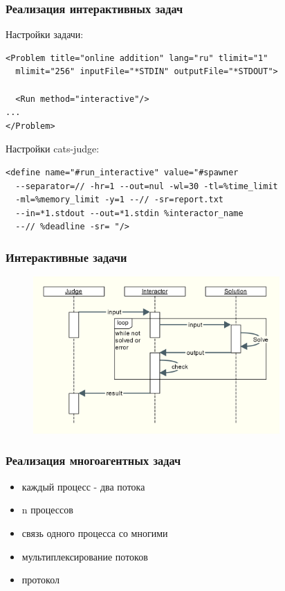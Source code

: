 \documentclass{beamer}
\begin{document}
\begin{frame}[fragile]
  \frametitle{Реализация интерактивных задач}
Настройки задачи:
\begin{lstlisting}
<Problem title="online addition" lang="ru" tlimit="1"
  mlimit="256" inputFile="*STDIN" outputFile="*STDOUT">

  <Run method="interactive"/>
...
</Problem>
\end{lstlisting}
Настройки cats-judge:
\begin{lstlisting}
<define name="#run_interactive" value="#spawner
  --separator=// -hr=1 --out=nul -wl=30 -tl=%time_limit
  -ml=%memory_limit -y=1 --// -sr=report.txt
  --in=*1.stdout --out=*1.stdin %interactor_name
  --// %deadline -sr= "/>
\end{lstlisting}
\end{frame}

\begin{frame}
  \frametitle{Интерактивные задачи}
  \begin{figure}[htb]
  \centering
  \includegraphics[height=6cm,keepaspectratio]{./img/interactive_problem.png}
  \end{figure}
\end{frame}

\begin{frame}
  \frametitle{Реализация многоагентных задач}
  \begin{itemize}
  \item каждый процесс - два потока
  \item n процессов
  \item связь одного процесса со многими
  \item мультиплексирование потоков
  \item протокол
  \end{itemize}
\end{frame}
\end{document}
